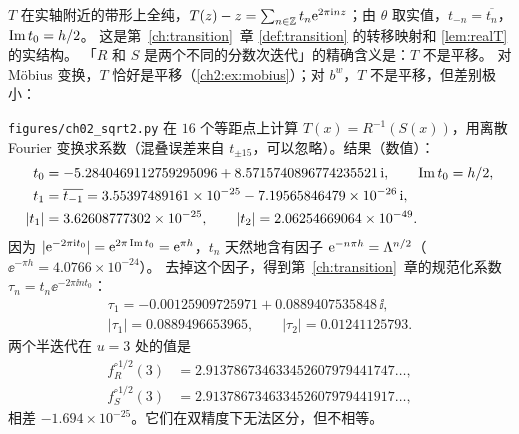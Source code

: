 $T$ 在实轴附近的带形上全纯，$T(z)-z=\sum_{n\in\mathbb{Z}}t_n\mathrm{e}^{2\pi\mathrm{i} nz}$；由 $\theta$ 取实值，$t_{-n}=\overline{t_n}$，$\operatorname{Im} t_0=h/2$。
这是第~\ref{ch:transition}~章 \cref{def:transition} 的转移映射和 \cref{lem:realT} 的实结构。
「$R$ 和 $S$ 是两个不同的分数次迭代」的精确含义是：$T$ 不是平移。
对 Möbius 变换，$T$ 恰好是平移（\cref{ch2:ex:mobius}）；对 $b^w$，$T$ 不是平移，但差别极小：

\begin{example}[$b=\sqrt2$ 的转移映射]\label{ch2:ex:sqrt2-transition}
\texttt{figures/ch02\_sqrt2.py} 在 $16$ 个等距点上计算 $T(x)=R^{-1}(S(x))$，用离散 Fourier 变换求系数（混叠误差来自 $t_{\pm15}$，可以忽略）。结果（数值）：
\[
\begin{aligned}
  t_0&=-5.2840469112759295096+8.5715740896774235521\,\mathrm{i},\qquad \operatorname{Im} t_0=h/2,\\
  t_1&=\overline{t_{-1}}=3.55397489161\times10^{-25}-7.19565846479\times10^{-26}\,\mathrm{i},\\
  |t_1|&=3.62608777302\times10^{-25},\qquad |t_2|=2.06254669064\times10^{-49}.
\end{aligned}
\]
因为 $|\mathrm{e}^{-2\pi\mathrm{i} t_0}|=\mathrm{e}^{2\pi\operatorname{Im} t_0}=\mathrm{e}^{\pi h}$，$t_n$ 天然地含有因子 $\mathrm{e}^{-n\pi h}=\Lambda^{n/2}$（$\ee^{-\pi h}=4.0766\times10^{-24}$）。
去掉这个因子，得到第~\ref{ch:transition}~章的规范化系数 $\tau_n=t_n\ee^{-2\pi\ii nt_0}$：
\[
\begin{gathered}
  \tau_1=-0.00125909725971+0.0889407535848\,\ii,\\
  |\tau_1|=0.0889496653965,\qquad|\tau_2|=0.01241125793 .
\end{gathered}
\]
两个半迭代在 $u=3$ 处的值是
\[
\begin{aligned}
  f_R^{\circ1/2}(3)&=2.913786734633452607979441747\ldots,\\
  f_S^{\circ1/2}(3)&=2.913786734633452607979441917\ldots,
\end{aligned}
\]
相差 $-1.694\times10^{-25}$。它们在双精度下无法区分，但不相等。
\end{example}


